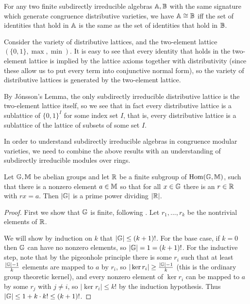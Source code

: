 \begin{appendices}
\begin{cor} For any two finite subdirectly irreducible algebras $\mathbb{A}, \mathbb{B}$ with the same signature which generate congruence distributive varieties, we have $\mathbb{A} \cong \mathbb{B}$ iff the set of identities that hold in $\mathbb{A}$ is the same as the set of identities that hold in $\mathbb{B}$.
\end{cor}

\begin{ex} Consider the variety of distributive lattices, and the two-element lattice $(\{0,1\},\max,\min)$. It is easy to see that every identity that holds in the two-element lattice is implied by the lattice axioms together with distributivity (since these allow us to put every term into conjunctive normal form), so the variety of distributive lattices is generated by the two-element lattice.

By J\'onsson's Lemma, the only subdirectly irreducible distributive lattice is the two-element lattice itself, so we see that in fact every distributive lattice is a sublattice of $\{0,1\}^I$ for some index set $I$, that is, every distributive lattice is a sublattice of the lattice of subsets of some set $I$.
\end{ex}

In order to understand subdirectly irreducible algebras in congruence modular varieties, we need to combine the above results with an understanding of subdirectly irreducible modules over rings.

\begin{prop} Let $\mathbb{G},\mathbb{M}$ be abelian groups and let $\mathbb{R}$ be a finite subgroup of $\operatorname{Hom}(\mathbb{G},\mathbb{M})$, such that there is a nonzero element $a \in \mathbb{M}$ so that for all $x \in \mathbb{G}$ there is an $r \in \mathbb{R}$ with $rx = a$. Then $|\mathbb{G}|$ is a prime power dividing $|\mathbb{R}|$.
\end{prop}
\begin{proof} First we show that $\mathbb{G}$ is finite, following \cite{commutator-theory}. Let $r_1, ..., r_k$ be the nontrivial elements of $\mathbb{R}$.

We will show by induction on $k$ that $|\mathbb{G}| \le (k+1)!$. For the base case, if $k = 0$ then $\mathbb{G}$ can have no nonzero elements, so $|\mathbb{G}| = 1 = (k+1)!$. For the inductive step, note that by the pigeonhole principle there is some $r_i$ such that at least $\frac{|\mathbb{G}|-1}{k}$ elements are mapped to $a$ by $r_i$, so $|\ker r_i| \ge \frac{|\mathbb{G}|-1}{k}$ (this is the ordinary group theoretic kernel), and every nonzero element of $\ker r_i$ can be mapped to $a$ by some $r_j$ with $j \ne i$, so $|\ker r_i| \le k!$ by the induction hypothesis. Thus $|\mathbb{G}| \le 1 + k\cdot k! \le (k+1)!$.


\end{proof}
\end{appendices}
